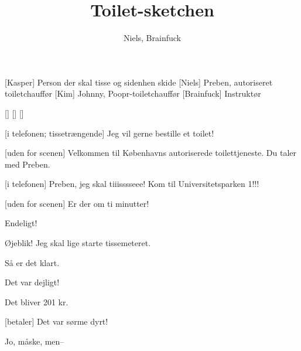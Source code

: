 \documentclass[a4paper,11pt]{article}
\title{Toilet-sketchen}
\author{Niels, Brainfuck}
\begin{document}
\maketitle

\begin{roles}
[Kasper] Person der skal tisse og sidenhen skide
[Niels] Preben, autoriseret toiletchauffør
[Kim] Johnny, Poopr-toiletchauffør
[Brainfuck] Instruktør
\end{roles}

\begin{props}
[]
[]
[]
\end{props}


\begin{sketch}


[i telefonen; tissetrængende] Jeg vil gerne bestille et toilet!

[uden for scenen] Velkommen til Københavns autoriserede toilettjeneste.  Du taler med Preben.

[i telefonen] Preben, jeg skal tiiisssseee!  Kom til Universitetsparken 1!!!

[uden for scenen] Er der om ti minutter!


 Endeligt!


 Øjeblik!  Jeg skal lige starte tissemeteret.


 Så er det klart.



 Det var dejligt!

 Det bliver  201 kr.

[betaler] Det var sørme dyrt!

 Jo, måske, men-- 



\end{sketch}
\end{document}
